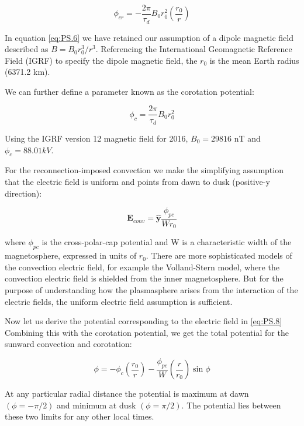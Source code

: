 \documentclass[utf8]{report}
\begin{document}
\begin{equation}
    \phi_{cr} = -\frac{2\pi}{\tau_{d}}B_{0}r_{0}^{2}(\frac{r_{0}}{r})
    \label{eq:PS.7}
\end{equation}

In equation \ref{eq:PS.6} we have retained our assumption of a dipole magnetic field described as $B = B_{0}r_{0}^{3}/r^{3}$. Referencing the International Geomagnetic Reference Field (IGRF) to specify the dipole magnetic field, the $r_{0}$ is the mean Earth radius (6371.2 km). 

We can further define a parameter known as the corotation potential: 

\begin{equation}
    \phi_{c} = \frac{2\pi}{\tau_{d}}B_{0}r^{2}_{0}
    \label{eq:PS.8}
\end{equation}

Using the IGRF version 12 magnetic field for 2016, $B_{0} = 29816$ nT and $\phi_{c} = 88.01 kV$. 

For the reconnection-imposed convection we make the simplifying assumption that the electric field is uniform and points from dawn to dusk (positive-y direction): 

\begin{equation}
    \textbf{E}_{conv} = \hat{\textbf{y}} \frac{\phi_{pc}}{Wr_{0}}
    \label{eq:PS.9}
\end{equation}

where $\phi_{pc}$ is the cross-polar-cap potential and W is a characteristic width of the magnetosphere, expressed in units of $r_{0}$. There are more sophisticated models of the convection electric field, for example the Volland-Stern model, where the convection electric field is shielded from the inner magnetosphere. But for the purpose of understanding how the plasmasphere arises from the interaction of the electric fields, the uniform electric field assumption is sufficient. 

Now let us derive the potential corresponding to the electric field in \ref{eq:PS.8} Combining this with the corotation potential, we get the total potential for the sunward convection and corotation: 

\begin{equation}
    \phi = -\phi_{c} (\frac{r_{0}}{r}) - \frac{\phi_{pc}}{W}(\frac{r}{r_{0}})\sin{\phi}
    \label{eq:PS.10}
\end{equation}

At any particular radial distance the potential is maximum at dawn $(\phi = -\pi/2)$ and minimum at dusk $(\phi = \pi/2)$. The potential lies between these two limits for any other local times. 
\end{document}

